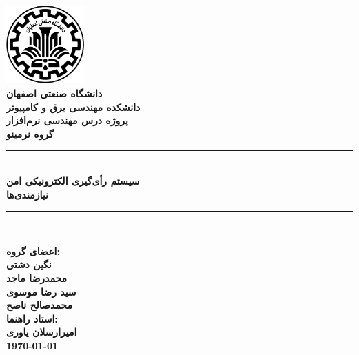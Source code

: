 \documentclass[12pt]{article}
\begin{document}
\pagestyle{empty}
\begin{titlepage}
\begin{center}
\includegraphics[width=3cm]{logo.png} \\
{\fontsize{12}{12}\selectfont \bfseries دانشگاه صنعتی اصفهان}\\
{\fontsize{12}{12}\selectfont \bfseries دانشکده مهندسی برق و کامپیوتر}\\
\vspace{2cm}
{\fontsize{14}{14}\selectfont \bfseries پروژه درس مهندسی نرم‌افزار} \\[5mm]
{\fontsize{18}{18}\selectfont \bfseries گروه نرمینو} \\[5mm]
{\textcolor{Blue}{\rule{\textwidth}{1mm}}}  \\
{\fontsize{24}{24}\selectfont \bfseries
سیستم رأی‌گیری الکترونیکی امن
}\\[5mm]
{\fontsize{16}{16}\selectfont \bfseries نیازمندی‌ها}
\\
{\textcolor{Blue}{\rule{\textwidth}{1mm}}}  \\
\vspace{1cm}

{\fontsize{14}{14}\selectfont \bfseries اعضای گروه:} \\[3mm]
{\fontsize{16}{16}\selectfont \bfseries نگین دشتی } \\
{\fontsize{16}{16}\selectfont \bfseries محمدرضا ماجد} \\
{\fontsize{16}{16}\selectfont \bfseries سید رضا موسوی } \\
{\fontsize{16}{16}\selectfont \bfseries محمدصالح ناصح  } \\
\vspace{1cm}
{\fontsize{14}{14}\selectfont \bfseries استاد راهنما: } \\[3mm]
{\fontsize{16}{16}\selectfont \bfseries امیرارسلان یاوری } \\
\vfill
{\fontsize{16}{16}\selectfont \bfseries\today}
\end{center}
\end{titlepage}

\clearpage
\tableofcontents
\clearpage
\pagestyle{fancy}
\lhead{}
\rhead{}
\end{document}
